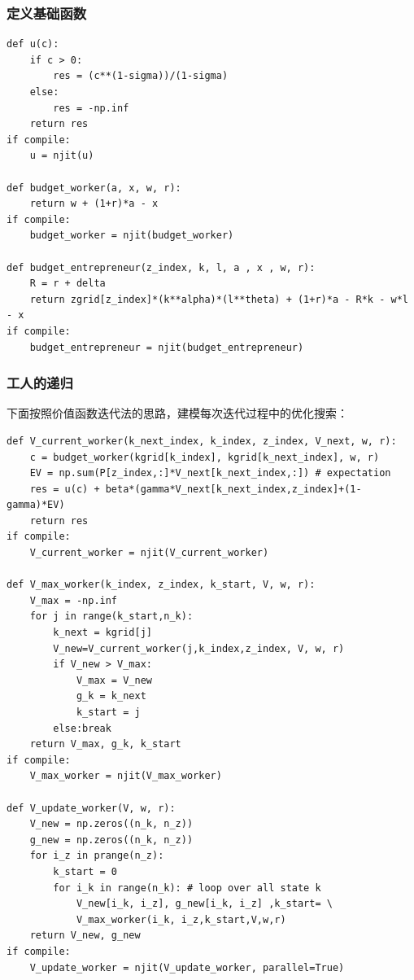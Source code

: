 \documentclass[a4paper, 12pt]{ctexart}
\begin{document}
\subsubsection{定义基础函数}
\begin{lstlisting}
def u(c):
    if c > 0:
        res = (c**(1-sigma))/(1-sigma)
    else:
        res = -np.inf
    return res
if compile:
    u = njit(u)
    
def budget_worker(a, x, w, r):
    return w + (1+r)*a - x
if compile:
    budget_worker = njit(budget_worker)
    
def budget_entrepreneur(z_index, k, l, a , x , w, r):
    R = r + delta
    return zgrid[z_index]*(k**alpha)*(l**theta) + (1+r)*a - R*k - w*l - x
if compile:
    budget_entrepreneur = njit(budget_entrepreneur)
\end{lstlisting}
\subsubsection{工人的递归}
下面按照价值函数迭代法的思路，建模每次迭代过程中的优化搜索：
\begin{lstlisting}
def V_current_worker(k_next_index, k_index, z_index, V_next, w, r):
    c = budget_worker(kgrid[k_index], kgrid[k_next_index], w, r)
    EV = np.sum(P[z_index,:]*V_next[k_next_index,:]) # expectation
    res = u(c) + beta*(gamma*V_next[k_next_index,z_index]+(1-gamma)*EV)
    return res
if compile:
    V_current_worker = njit(V_current_worker)
    
def V_max_worker(k_index, z_index, k_start, V, w, r):
    V_max = -np.inf
    for j in range(k_start,n_k):
        k_next = kgrid[j]
        V_new=V_current_worker(j,k_index,z_index, V, w, r)
        if V_new > V_max:
            V_max = V_new
            g_k = k_next
            k_start = j
        else:break
    return V_max, g_k, k_start
if compile:
    V_max_worker = njit(V_max_worker)

def V_update_worker(V, w, r):
    V_new = np.zeros((n_k, n_z))
    g_new = np.zeros((n_k, n_z))
    for i_z in prange(n_z): 
        k_start = 0
        for i_k in range(n_k): # loop over all state k
            V_new[i_k, i_z], g_new[i_k, i_z] ,k_start= \
            V_max_worker(i_k, i_z,k_start,V,w,r)
    return V_new, g_new
if compile:
    V_update_worker = njit(V_update_worker, parallel=True)
\end{lstlisting}
\end{document}
